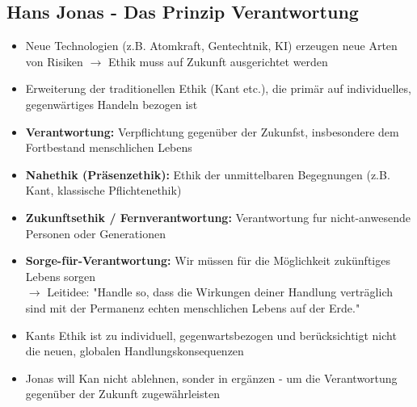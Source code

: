 \subsection{Hans Jonas - Das Prinzip Verantwortung}
\begin{itemize}
    \item Neue Technologien (z.B. Atomkraft, Gentechtnik, KI) erzeugen neue Arten von Risiken $\rightarrow$ Ethik muss auf Zukunft ausgerichtet werden
    \item Erweiterung der traditionellen Ethik (Kant etc.), die primär auf individuelles, gegenwärtiges Handeln bezogen ist
\end{itemize}

\begin{itemize}
    \item \textbf{Verantwortung:} Verpflichtung gegenüber der Zukunfst, insbesondere dem Fortbestand menschlichen Lebens
    \item \textbf{Nahethik (Präsenzethik):} Ethik der unmittelbaren Begegnungen (z.B. Kant, klassische Pflichtenethik)
    \item \textbf{Zukunftsethik / Fernverantwortung:} Verantwortung fur nicht-anwesende Personen oder Generationen
    \item \textbf{Sorge-für-Verantwortung:} Wir müssen für die Möglichkeit zukünftiges Lebens sorgen \\
    $\rightarrow$ Leitidee: "Handle so, dass die Wirkungen deiner Handlung verträglich sind mit der Permanenz echten menschlichen Lebens auf der Erde."
\end{itemize}


\begin{itemize}
    \item Kants Ethik ist zu individuell, gegenwartsbezogen und berücksichtigt nicht die neuen, globalen Handlungskonsequenzen
    \item Jonas will Kan nicht ablehnen, sonder in ergänzen - um die Verantwortung gegenüber der Zukunft zugewährleisten
\end{itemize}

